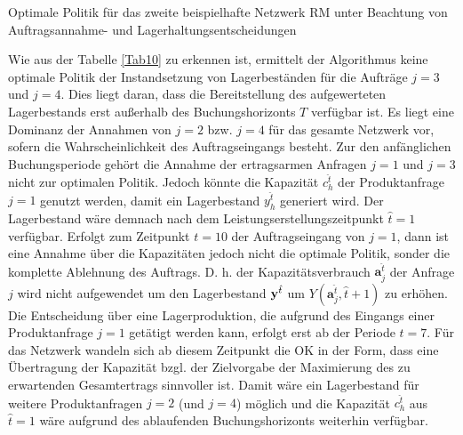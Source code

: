 \begin{table}
\renewcommand{\arraystretch}{1}
\begin{footnotesize}
     \caption{Optimale Politik für das zweite beispielhafte Netzwerk RM unter Beachtung von Auftragsannahme- und Lagerhaltungsentscheidungen} \label{Tab10}
        \begin{center}
      \end{center}
\end{footnotesize}
\end{table}

Wie aus der Tabelle \ref{Tab10} zu erkennen ist, ermittelt der Algorithmus keine optimale Politik der Instandsetzung von Lagerbeständen für die Aufträge $j=3$ und $j=4$. Dies liegt daran, dass die Bereitstellung des aufgewerteten Lagerbestands erst außerhalb des Buchungshorizonts $T$ verfügbar ist. Es liegt eine Dominanz der Annahmen von $j=2$ bzw. $j=4$ für das gesamte Netzwerk vor, sofern die Wahrscheinlichkeit des Auftragseingangs besteht. Zur den anfänglichen Buchungsperiode gehört die Annahme der ertragsarmen Anfragen $j=1$ und $j=3$ nicht zur optimalen Politik. Jedoch könnte die Kapazität $c_{h}^{\hat t}$ der Produktanfrage $j=1$ genutzt werden, damit ein Lagerbestand $y_{h}^{\hat t}$ generiert wird. Der Lagerbestand wäre demnach nach dem Leistungserstellungszeitpunkt $\hat{t}=1$ verfügbar. Erfolgt zum Zeitpunkt $t=10$ der Auftragseingang von $j=1$, dann ist eine Annahme über die Kapazitäten jedoch nicht die optimale Politik, sonder die komplette Ablehnung des Auftrags. D. h. der Kapazitätsverbrauch $\textbf{a}^{\hat t}_j$ der Anfrage $j$ wird nicht aufgewendet um den Lagerbestand $\textbf y^{\hat t}$ um $Y(\textbf{a}^{\hat t}_j,\hat t+1)$ zu erhöhen. Die Entscheidung über eine Lagerproduktion, die aufgrund des Eingangs einer Produktanfrage $j=1$ getätigt werden kann, erfolgt erst ab der Periode $t=7$. Für das Netzwerk wandeln sich ab diesem Zeitpunkt die OK in der Form, dass eine Übertragung der Kapazität bzgl. der Zielvorgabe der Maximierung des zu erwartenden Gesamtertrags sinnvoller ist. Damit wäre ein Lagerbestand für weitere Produktanfragen $j=2$ (und $j=4$) möglich und die Kapazität $c_{h}^{\hat t}$ aus $\hat{t}=1$ wäre aufgrund des ablaufenden Buchungshorizonts weiterhin verfügbar.\\[.5cm]

